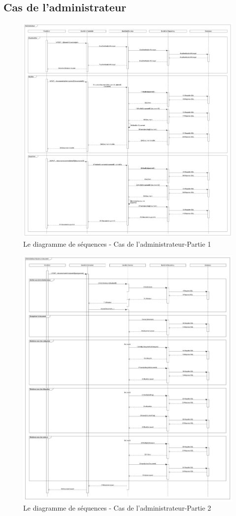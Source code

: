 		\newpage
		\subsection{Cas de l'administrateur}
			\begin{figure}[ht]
				\centering
				\includegraphics[height=0.7\textheight]{Pictures/DiagrammeDeSequenceAdministrateur.jpg}
				\caption{Le diagramme de s\'equences - Cas de l'administrateur-Partie 1}
				\label{DiagrammeDeSequenceAdmin1}
			\end{figure}
			
			\begin{figure}[ht]
			\centering
			\includegraphics[height=0.7\textheight]{Pictures/DiagrammeDeSequenceAJouterDocument.jpg}
			\caption{Le diagramme de s\'equences - Cas de l'administrateur-Partie 2}
			\label{DiagrammeDeSequenceAdmin2}
			\end{figure}




